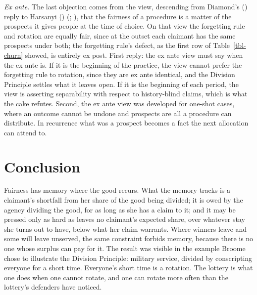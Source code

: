 \documentclass[
  11pt,
  letterpaper,
  DIV=11,
  numbers=noendperiod,
  twoside]{scrartcl}
\begin{document}
\emph{Ex ante.} The last objection comes from the view, descending from
Diamond's () reply to Harsanyi
() (; ),
that the fairness of a procedure is a matter of the prospects it gives
people at the time of choice. On that view the forgetting rule and
rotation are equally fair, since at the outset each claimant has the
same prospects under both; the forgetting rule's defect, as the first
row of Table~\ref{tbl-churn} showed, is entirely ex post. First reply:
the ex ante view must say when the ex ante is. If it is the beginning of
the practice, the view cannot prefer the forgetting rule to rotation,
since they are ex ante identical, and the Division Principle settles
what it leaves open. If it is the beginning of each period, the view is
asserting separability with respect to history-blind claims, which is
what the cake refutes. Second, the ex ante view was developed for
one-shot cases, where an outcome cannot be undone and prospects are all
a procedure can distribute. In recurrence what was a prospect becomes a
fact the next allocation can attend to.

\section{Conclusion}\label{sec-conclusion}

Fairness has memory where the good recurs. What the memory tracks is a
claimant's shortfall from her share of the good being divided; it is
owed by the agency dividing the good, for as long as she has a claim to
it; and it may be pressed only as hard as leaves no claimant's expected
share, over whatever stay she turns out to have, below what her claim
warrants. Where winners leave and some will leave unserved, the same
constraint forbids memory, because there is no one whose surplus can pay
for it. The result was visible in the example Broome chose to illustrate
the Division Principle: military service, divided by conscripting
everyone for a short time. Everyone's short time is a rotation. The
lottery is what one does when one cannot rotate, and one can rotate more
often than the lottery's defenders have noticed.
\end{document}
